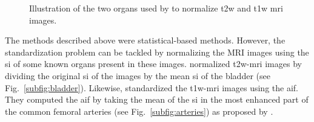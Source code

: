 \begin{enumerate}[leftmargin=*]
\begin{figure}
\centering
	\hspace*{\fill}
	 \hfill
	\hspace*{\fill}
	\caption{Illustration of the two organs used by \cite{Niaf2011,Niaf2012} to normalize \ac{t2w} and \ac{t1w} \ac{mri} images.}
	\label{fig:niaf}
\end{figure}

The methods described above were statistical-based methods. However, the standardization problem can be tackled by normalizing the MRI images using the \ac{si} of some known organs present in these images. \cite{Niaf2011,Niaf2012} normalized \ac{t2w}-\ac{mri} images by dividing the original \ac{si} of the images by the mean \ac{si} of the bladder (see Fig.~\ref{subfig:bladder}). Likewise, \cite{Niaf2011} standardized the \ac{t1w}-\ac{mri} images using the \ac{aif}. They computed the \ac{aif} by taking the mean of the \ac{si} in the most enhanced part of the common femoral arteries (see Fig.~\ref{subfig:arteries}) as proposed by \cite{Wiart2007}.

\end{enumerate}

